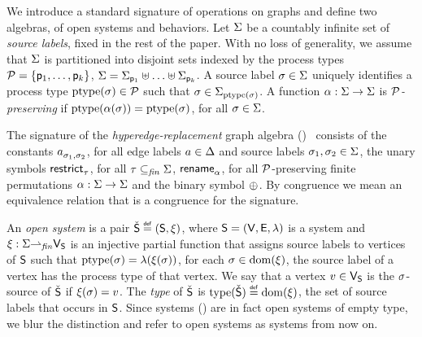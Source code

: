 We introduce a standard signature of operations on graphs and define
two algebras, of open systems and behaviors. Let $\Sigma$ be a
countably infinite set of \emph{source labels}, fixed in the rest of
the paper. With no loss of generality, we assume that $\Sigma$
is partitioned into disjoint sets indexed by the process types
$\mathcal{P} = {\{ {\mathsf{p}_1, \ldots, \mathsf{p}_k} \}}$,
\ie $\Sigma = \Sigma_{\mathsf{p}_1} \uplus \ldots \uplus \Sigma_{\mathsf{p}_k}$.
A source label $\sigma\in\Sigma$
uniquely identifies a process type ${\mathrm{ptype}({\sigma})}\in\mathcal{P}$ such
that $\sigma \in \Sigma_{{\mathrm{ptype}({\sigma})}}$.
A function $\alpha : \Sigma \rightarrow \Sigma$ is
\emph{$\mathcal{P}$-preserving} if
${\mathrm{ptype}({\alpha(\sigma)})}={\mathrm{ptype}({\sigma})}$,
for all $\sigma\in\Sigma$.

The signature of the \emph{hyperedge-replacement} graph algebra
(\hrtext)~\cite{courcelle_engelfriet_2012} consists of the constants
${a}^{}_{{\sigma_1},{\sigma_2}}$, for all edge labels $a\in\Delta$
and source labels $\sigma_1, \sigma_2 \in \Sigma$, the unary
symbols $\mathsf{restrict}^{}_{{\tau}}$, for all $\tau \subseteq_{\mathit{fin}}
\Sigma$, $\mathsf{rename}^{}_{{\alpha}}$, for all $\mathcal{P}$-preserving
finite permutations $\alpha: \Sigma \rightarrow \Sigma$
and the binary symbol $\oplus^{}$. By \hrtext{} congruence we mean an
equivalence relation that is a congruence for the \hrtext{} signature.

An \emph{open system} is a pair $\check{\mathsf{S}} \stackrel{\scriptscriptstyle{\mathsf{def}}}{=}
(\mathsf{S},\xi)$, where $\mathsf{S}=(\mathsf{V},\mathsf{E},\lambda)$ is a system and
$\xi : \Sigma {\rightharpoonup_{\mathit{fin}}} \mathsf{V}_{\mathsf{S}}$ is an injective
partial function that assigns source labels to vertices of $\mathsf{S}$
such that ${\mathrm{ptype}({\sigma})}=\lambda(\xi(\sigma))$, for each
$\sigma\in{\mathrm{dom}({\xi})}$, \ie the source label of a vertex has the
process type of that vertex. We say that a vertex $v\in\mathsf{V}_{\mathsf{S}}$
is the $\sigma$-source of $\check{\mathsf{S}}$ if $\xi(\sigma)=v$. The
\emph{type} of $\check{\mathsf{S}}$ is
$\mathrm{type}({\check{\mathsf{S}}})\stackrel{\scriptscriptstyle{\mathsf{def}}}{=}{\mathrm{dom}({\xi})}$, \ie the set of source
labels that occurs in $\mathsf{S}$. Since systems () are
in fact open systems of empty type, we blur the distinction and refer
to open systems as systems from now on.

